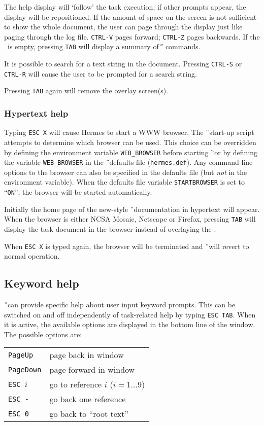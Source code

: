 The help display will `follow' the task execution; if other prompts appear,
the display will be repositioned.
If the amount of space on the screen is not sufficient to show the whole
document,
the user can page through the display just like paging through the log file.
{\tt CTRL-V}\label{ctrlvvv}  pages forward; {\tt CTRL-Z}\label{ctrlzzz}
pages backwards.
If the \UCA\ is empty, pressing {\tt TAB} will display
a summary of \H' commands.

It is possible to search for a text string in the document. Pressing
{\tt CTRL-S}\label{ctrlss} or {\tt CTRL-R}\label{ctrlrr} will cause the
user to be prompted for a search string.

Pressing {\tt TAB} again will remove the overlay screen(s).

\subsubsection*{Hypertext help}
Typing {\tt ESC X}\label{escx} will cause Hermes to start a WWW browser.
The \G\ start-up script attempts to determine which browser can be used.
This choice can be overridden by defining the environment variable
{\tt WEB\_BROWSER} before starting \G\ or by defining the variable
{\tt WEB\_BROWSER} in the \H\ defaults file ({\tt hermes.def}).
Any command line options to the browser can also be specified in the
defaults file (but {\em not\/} in the environment variable).
When the defaults file variable {\tt STARTBROWSER} is set to ``{\tt ON}'',
the browser will be started automatically. 

Initially the home page of the new-style \G\ documentation in hypertext
will appear. When the browser is either NCSA Mosaic, Netscape or Firefox,
pressing {\tt TAB} will display the task document in the browser instead 
of overlaying the \COA.

When {\tt ESC X} is typed again, the browser will be terminated and \H\ will
revert to normal operation.

\subsection*{Keyword help}
\H\ can provide specific help about user input keyword prompts.
This can be switched on and off independently of task-related help
by typing {\tt ESC TAB}.
When it is active, the available options are displayed in the bottom line of
the window. The possible options are:

\begin{tabular}{ll}
{\tt PageUp}&page back in window\\
{\tt PageDown}&page forward in window\\
{\tt ESC $i$}&go to reference $i$ ($i=1\ldots 9$)\\
{\tt ESC -}&go back one reference\\
{\tt ESC 0}&go back to ``root text''\\
\end{tabular}

